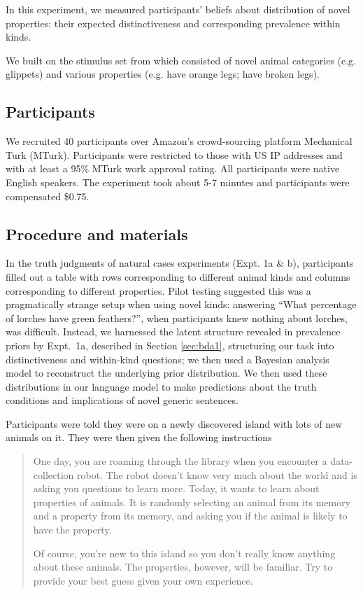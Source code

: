 \documentclass[10pt,letterpaper]{article}
\begin{document}
In this experiment, we measured participants' beliefs about distribution of novel properties: their expected distinctiveness and corresponding prevalence within kinds.

We built on the stimulus set from  which consisted of novel animal categories (e.g. glippets) and various properties (e.g. have orange legs; have broken legs).


\subsection{Participants}

We recruited 40 participants over Amazon's crowd-sourcing platform Mechanical Turk (MTurk).  
Participants were restricted to those with US IP addresses and with at least a 95\% MTurk work approval rating. 
All participants were native English speakers. 
The experiment took about 5-7 minutes and participants were compensated \$0.75.

\subsection{Procedure and materials}

In the truth judgments of natural cases experiments (Expt. 1a \& b), participants filled out a table with rows corresponding to different animal kinds and columns corresponding to different properties. 
Pilot testing suggested this was a pragmatically strange setup when using novel kinds: answering ``What percentage of lorches have green feathers?'', when participants knew nothing about lorches, was difficult.
Instead, we harnessed the latent structure revealed in prevalence priors by Expt.~1a, described in Section \ref{sec:bda1}, structuring our task into distinctiveness and within-kind questions; we then used a Bayesian analysis model to reconstruct the underlying prior distribution. 
We then used these distributions in our language model to make predictions about the truth conditions and implications of novel generic sentences.


Participants were told they were on a newly discovered island with lots of new animals on it. They were then given the following instructions

\begin{quote}
One day, you are roaming through the library when you encounter a data-collection robot. The robot doesn't know very much about the world and is asking you questions to learn more. Today, it wants to learn about properties of animals. It is randomly selecting an animal from its memory and a property from its memory, and asking you if the animal is likely to have the property.

Of course, you're new to this island so you don't really know anything about these animals. The properties, however, will be familiar. Try to provide your best guess given your own experience.
\end{quote}
\end{document}
